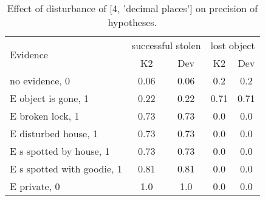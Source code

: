 \begin{table}\begin{tabular}{l|cc|cc}\toprule\multirow{2}{*}{Evidence} & \multicolumn{2}{c}{successful stolen}& \multicolumn{2}{c}{lost object}\\& {K2} & {Dev}& {K2} & {Dev}\\\midrule
no evidence, 0 & 0.06&0.06&0.2&0.2\\E object is gone, 1 & 0.22&0.22&0.71&0.71\\E broken lock, 1 & 0.73&0.73&0.0&0.0\\E disturbed house, 1 & 0.73&0.73&0.0&0.0\\E s spotted by house, 1 & 0.73&0.73&0.0&0.0\\E s spotted with goodie, 1 & 0.81&0.81&0.0&0.0\\E private, 0 & 1.0&1.0&0.0&0.0\\\bottomrule\end{tabular}\caption{Effect of disturbance of [4, 'decimal places'] on precision of hypotheses.}\end{table}